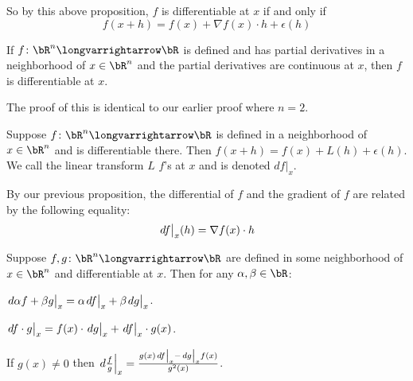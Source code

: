 \documentclass[10pt]{article}
\def\differ#1#2{\left.d#1\strut\right|_{#2}}
\begin{document}
So by this above proposition, $f$ is differentiable at $x$ if and only if
\[ f(x+h) = f(x) + \nabla f(x)\cdot h + \epsilon(h) \]

\begin{prop*}

    If $f\colon\bR^n\longvarrightarrow\bR$ is defined and has partial derivatives in a neighborhood of $x\in\bR^n$ and the partial derivatives are continuous at $x$, then $f$ is differentiable at $x$.

\end{prop*}

The proof of this is identical to our earlier proof where $n=2$.

\begin{defn*}

    Suppose $f\colon\bR^n\longvarrightarrow\bR$ is defined in a neighborhood of $x\in\bR^n$ and is differentiable there.
    Then $f(x+h)=f(x)+L(h)+\epsilon(h)$.
    We call the linear transform $L$ $f$'s  at $x$ and is denoted $df\bigl|_x$.

\end{defn*}

By our previous proposition, the differential of $f$ and the gradient of $f$ are related by the following equality:
\[ \differ fx(h) = \nabla f(x)\cdot h \]

\begin{prop*}

    Suppose $f,g\colon\bR^n\longvarrightarrow\bR$ are defined in some neighborhood of $x\in\bR^n$ and differentiable at $x$.
    Then for any $\alpha,\beta\in\bR$:
    \benum
        \item $\differ{\alpha f+\beta g}x=\alpha\differ fx+\beta\differ gx$.
        \item $\differ{f\cdot g}x = f(x)\cdot\differ gx+\differ fx\cdot g(x)$.
        \item If $g(x)\neq0$ then $\differ{\frac fg}x=\frac{g(x)\differ fx-\differ gx f(x)}{g^2(x)}$.
    \eenum

\end{prop*}
\end{document}
